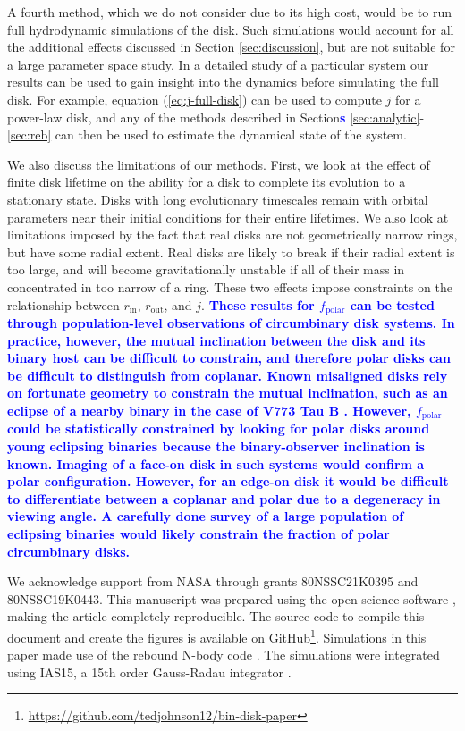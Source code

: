\documentclass[twocolumn,linenumbers]{aastex631}
\newcommand\ghurl[0]{\url{https://github.com/tedjohnson12/bin-disk-paper}}
\newcommand{\RR}[1]{\textcolor{blue}{\bf#1}} %
\begin{document}
A fourth method, which we do not consider due to its high cost, would be to run full hydrodynamic simulations of the disk. Such simulations would account for all the additional effects discussed in Section \ref{sec:discussion}, but are not suitable for a large parameter space study. In a detailed study of a particular system our results can be used to gain insight into the dynamics before simulating the full disk. For example, equation (\ref{eq:j-full-disk}) can be used to compute $j$ for a power-law disk, and any of the methods described in Section\RR{s} \ref{sec:analytic}-\ref{sec:reb} can then be used to estimate the dynamical state of the system.

We also discuss the limitations of our methods. First, we look at the effect of finite disk lifetime on the ability for a disk to complete its evolution to a stationary state. Disks with long evolutionary timescales remain with orbital parameters near their initial conditions for their entire lifetimes. We also look at limitations imposed by the fact that real disks are not geometrically narrow rings, but have some radial extent. Real disks are likely to break if their radial extent is too large, and will become gravitationally unstable if all of their mass in concentrated in too narrow of a ring. These two effects impose constraints on the relationship between $r_\text{in}$, $r_\text{out}$, and $j$.
\RR{
These results for $f_\text{polar}$ can be tested through population-level observations of circumbinary disk systems. In practice, however, the mutual inclination between the disk and its binary host can be difficult to constrain, and therefore polar disks can be difficult to distinguish from coplanar. Known misaligned disks rely on fortunate geometry to constrain the mutual inclination, such as an eclipse of a nearby binary in the case of V773 Tau B \citep{kenworthy2022}. However, $f_\text{polar}$ could be statistically constrained by looking for polar disks around young eclipsing binaries because the binary-observer inclination is known. Imaging of a face-on disk in such systems would confirm a polar configuration. However, for an edge-on disk it would be difficult to differentiate between a coplanar and polar due to a degeneracy in viewing angle. A carefully done survey of a large population of eclipsing binaries \citep[e.g., those found by the Kepler Mission][]{kirk2016} would likely constrain the fraction of polar circumbinary disks.
}


\begin{acknowledgements}
\label{sec:ack}

We acknowledge support from NASA through grants 80NSSC21K0395 and 80NSSC19K0443. This manuscript was prepared using the open-science software \href{https://show-your.work/en/latest/intro/}{\showyourwork} \citep{luger2021}, making the article completely
reproducible. The source code to compile this document and create the figures is available on GitHub\footnote{\ghurl}.
Simulations in this paper made use of the {\sc rebound} N-body code \citep{rebound}.
The simulations were integrated using IAS15, a 15th order Gauss-Radau integrator \citep{reboundias15}. 

\end{acknowledgements}
\end{document}
